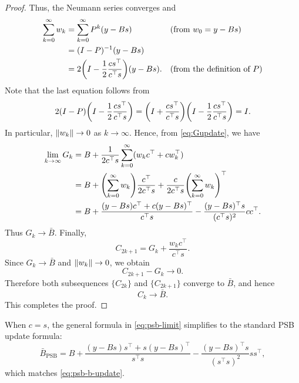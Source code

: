 \documentclass[0_en]{subfiles}
\begin{document}
\begin{proof}
    Thus, the Neumann series converges and
    \begin{align}
        \sum_{k=0}^{\infty}w_k & =        \sum_{k=0}^{\infty}P^k(y-Bs)                  &  & (\text{from } w_0=y-Bs)                               \\
                               & =  (I-P)^{-1}(y-Bs)                                                                                               \\
                               & = 2\qty(I-\frac{1}{2}\frac{cs^\top}{c^\top s}) (y-Bs). &  & (\text{from the definition of } P) \label{eq:wseries}
    \end{align}
    Note that the last equation follows from
    \begin{equation*}
        2(I-P) \qty(I-\frac{1}{2}\frac{cs^\top}{c^\top s}) = \qty(I + \frac{cs^\top}{c^\top s}) \qty(I-\frac{1}{2}\frac{cs^\top}{c^\top s}) = I.
    \end{equation*}
    In particular, $\norm{w_k}\to0$ as $k\to\infty$.
    Hence, from \cref{eq:Gupdate}, we have
    \begin{align}
        \lim_{k\to\infty}G_k
         & =
        B+\frac{1}{2c^\top s}
        \sum_{k=0}^{\infty}(w_k c^\top+c w_k^\top)                                                                                     \\
         & = B+ \qty(\sum_{k=0}^{\infty}w_k) \frac{c^\top}{2c^\top s} + \frac{c}{2c^\top s} \qty(\sum_{k=0}^{\infty}w_k)^\top          \\
         & = B + \frac{(y - Bs)c^\top + c(y - Bs)^\top}{c^\top s} - \frac{(y - Bs)^\top s}{(c^\top s)^2} c c^\top.  \label{eq:G-limit}
    \end{align}
    Thus $G_k\to\bar B$.
    Finally,
    \begin{equation}
        C_{2k+1}
        =
        G_k+\frac{w_k c^\top}{c^\top s}.
    \end{equation}
    Since $G_k\to\bar B$ and $\norm{w_k}\to0$, we obtain
    \begin{equation}
        C_{2k+1}-G_k\to0.
    \end{equation}
    Therefore both subsequences $\{C_{2k}\}$ and $\{C_{2k+1}\}$ converge to $\bar B$,
    and hence
    \begin{equation}
        C_k\to\bar B.
    \end{equation}
    This completes the proof.
\end{proof}

\noindent When $c = s$, the general formula in \cref{eq:psb-limit} simplifies to the standard PSB update formula:
\begin{equation}\label{eq:psb-standard}
    \bar{B}_{\mathrm{PSB}} = B + \frac{(y - Bs)s^\top + s(y - Bs)^\top}{s^\top s} - \frac{(y - Bs)^\top s}{(s^\top s)^2} ss^\top,
\end{equation}
which matches \cref{eq:psb-b-update}.
\end{document}
